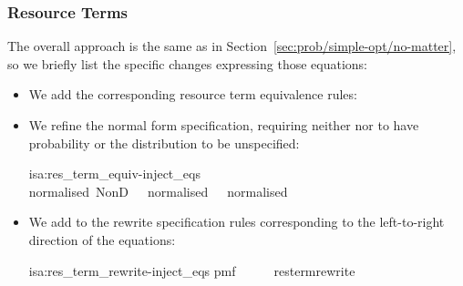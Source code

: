 \documentclass[class=smolathesis,crop=false]{standalone}
\begin{document}
\subsubsection{Resource Terms}
\label{sec:prob/simple-opt/inject-eqs/term}

The overall approach is the same as in Section~\ref{sec:prob/simple-opt/no-matter}, so we briefly list the specific changes expressing those equations:
\begin{itemize}
  \item We add the corresponding resource term equivalence rules:
  \item We refine the normal form specification, requiring neither  nor  to have probability  or the distribution to be unspecified:
    \begin{isadef}{isa:res_term_equiv-inject_eqs}
    \centering
      {\isachardoublequoteopen}normalised\ {\isacharparenleft}NonD\ \ {\isasymequiv}\ normalised\ \ {\isasymand}\ normalised\ \ {\isasymand}\ \ \isasymnoteq\ \ \isasymand\isanewline
    \end{isadef}
  \item We add to the rewrite specification rules corresponding to the left-to-right direction of the equations:
    \begin{isadef}{isa:res_term_rewrite-inject_eqs}
      \centering
      pmf\ \ \ \isacharequal\ \ \isasymLongrightarrow\ res{\isacharunderscore}term{\isacharunderscore}rewrite\ \ 

\end{isadef}
\end{itemize}
\end{document}
